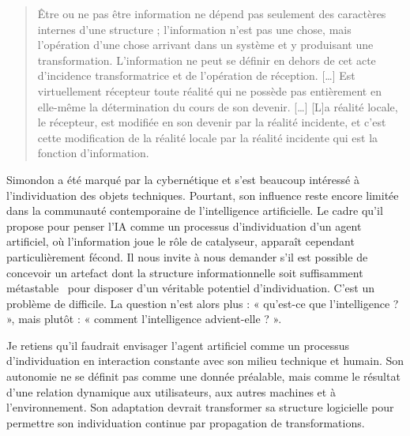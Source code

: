 \begin{quote}
Être ou ne pas être information ne dépend pas seulement des caractères internes d’une structure ; l’information n’est pas une chose, mais l’opération d’une chose arrivant dans un système et y produisant une transformation. 
L’information ne peut se définir en dehors de cet acte d’incidence transformatrice et de l’opération de réception. 
[…] Est virtuellement récepteur toute réalité qui ne possède pas entièrement en elle-même la détermination du cours de son devenir.
[…] [L]a réalité locale, le récepteur, est modifiée en son devenir par la réalité incidente, et c’est cette modification de la réalité locale par la réalité incidente qui est la fonction d’information.	
	\cite[p.~159]{simondon_communication_2015}
\end{quote}	

Simondon a été marqué par la cybernétique et s'est beaucoup intéressé à l'individuation des objets techniques.
Pourtant, son influence reste encore limitée dans la communauté contemporaine de l'intelligence artificielle. 
Le cadre qu’il propose pour penser l’IA comme un processus d'individuation d'un agent artificiel, où l'information joue le rôle de catalyseur, apparaît cependant particulièrement fécond.
Il nous invite à nous demander s’il est possible de concevoir un artefact dont la structure informationnelle soit \og suffisamment métastable \fg\ pour disposer d'un véritable potentiel d’individuation.
C'est un problème de  difficile. 
La question n’est alors plus : « qu’est-ce que l’intelligence ? », mais plutôt : « comment l’intelligence advient-elle ? ».

Je retiens qu'il faudrait envisager l'agent artificiel comme un processus d’individuation en interaction constante avec son milieu technique et humain. 
Son autonomie ne se définit pas comme une donnée préalable, mais comme le résultat d’une relation dynamique aux utilisateurs, aux autres machines et à l’environnement. Son adaptation devrait transformer sa structure logicielle pour permettre son individuation continue par propagation de transformations.




